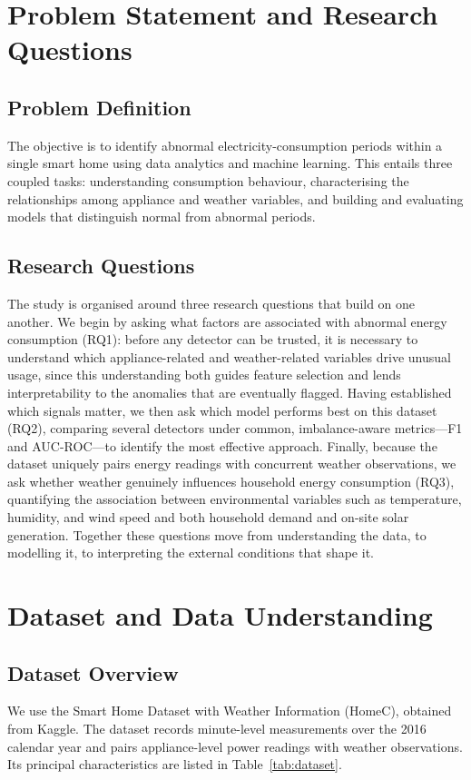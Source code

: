 \documentclass[pdflatex,sn-mathphys-num]{sn-jnl}%
\theoremstyle{thmstyleone}%
\theoremstyle{thmstyletwo}%
\theoremstyle{thmstylethree}%
\begin{document}
\section{Problem Statement and Research Questions}\label{sec:problem}

\subsection{Problem Definition}
The objective is to identify abnormal electricity-consumption periods within a single smart home using data analytics and machine learning. This entails three coupled tasks: understanding consumption behaviour, characterising the relationships among appliance and weather variables, and building and evaluating models that distinguish normal from abnormal periods.

\subsection{Research Questions}
The study is organised around three research questions that build on one another. We begin by asking what factors are associated with abnormal energy consumption (RQ1): before any detector can be trusted, it is necessary to understand which appliance-related and weather-related variables drive unusual usage, since this understanding both guides feature selection and lends interpretability to the anomalies that are eventually flagged. Having established which signals matter, we then ask which model performs best on this dataset (RQ2), comparing several detectors under common, imbalance-aware metrics---F1 and AUC-ROC---to identify the most effective approach. Finally, because the dataset uniquely pairs energy readings with concurrent weather observations, we ask whether weather genuinely influences household energy consumption (RQ3), quantifying the association between environmental variables such as temperature, humidity, and wind speed and both household demand and on-site solar generation. Together these questions move from understanding the data, to modelling it, to interpreting the external conditions that shape it.

\section{Dataset and Data Understanding}\label{sec:data}

\subsection{Dataset Overview}
We use the Smart Home Dataset with Weather Information (HomeC), obtained from Kaggle. The dataset records minute-level measurements over the 2016 calendar year and pairs appliance-level power readings with weather observations. Its principal characteristics are listed in Table~\ref{tab:dataset}.
\end{document}
